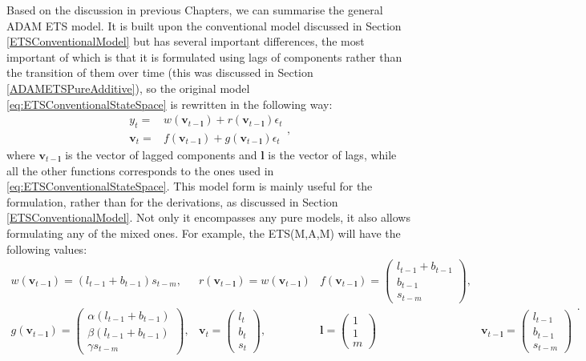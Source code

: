 \documentclass[
]{book}
\theoremstyle{definition}
\theoremstyle{definition}
\theoremstyle{definition}
\theoremstyle{definition}
\theoremstyle{remark}
\begin{document}
Based on the discussion in previous Chapters, we can summarise the general ADAM ETS model. It is built upon the conventional model discussed in Section \ref{ETSConventionalModel} but has several important differences, the most important of which is that it is formulated using lags of components rather than the transition of them over time (this was discussed in Section \ref{ADAMETSPureAdditive}), so the original model \eqref{eq:ETSConventionalStateSpace} is rewritten in the following way:
\begin{equation}
  \begin{aligned}
    {y}_{t} = &w(\mathbf{v}_{t-\boldsymbol{l}}) + r(\mathbf{v}_{t-\boldsymbol{l}}) \epsilon_t \\
    \mathbf{v}_{t} = &f(\mathbf{v}_{t-\boldsymbol{l}}) + g(\mathbf{v}_{t-\boldsymbol{l}}) \epsilon_t
  \end{aligned},
  \label{eq:ETSADAMStateSpace}
\end{equation}
where \(\mathbf{v}_{t-\boldsymbol{l}}\) is the vector of lagged components and \(\boldsymbol{l}\) is the vector of lags, while all the other functions corresponds to the ones used in \eqref{eq:ETSConventionalStateSpace}. This model form is mainly useful for the formulation, rather than for the derivations, as discussed in Section \ref{ETSConventionalModel}. Not only it encompasses any pure models, it also allows formulating any of the mixed ones. For example, the ETS(M,A,M) will have the following values:
\begin{equation}
  \begin{aligned}
    w(\mathbf{v}_{t-\boldsymbol{l}}) = (l_{t-1}+b_{t-1}) s_{t-m}, &
    r(\mathbf{v}_{t-\boldsymbol{l}}) = w(\mathbf{v}_{t-\boldsymbol{l}}) & 
    f(\mathbf{v}_{t-\boldsymbol{l}}) = \begin{pmatrix} l_{t-1} + b_{t-1} \\ b_{t-1} \\ s_{t-m} \end{pmatrix}, & \\
    g(\mathbf{v}_{t-\boldsymbol{l}}) = \begin{pmatrix} \alpha (l_{t-1} + b_{t-1}) \\ \beta (l_{t-1} + b_{t-1}) \\ \gamma s_{t-m} \end{pmatrix}, &
    \mathbf{v}_{t} = \begin{pmatrix} l_t \\ b_t \\ s_t \end{pmatrix}, &
    \boldsymbol{l} = \begin{pmatrix} 1 \\ 1 \\ m \end{pmatrix} &
    \mathbf{v}_{t-\boldsymbol{l}} = \begin{pmatrix} l_{t-1} \\ b_{t-1} \\ s_{t-m} \end{pmatrix}
  \end{aligned}.
  \label{eq:ETSADAMMAMMatrices}
\end{equation}
\end{document}
